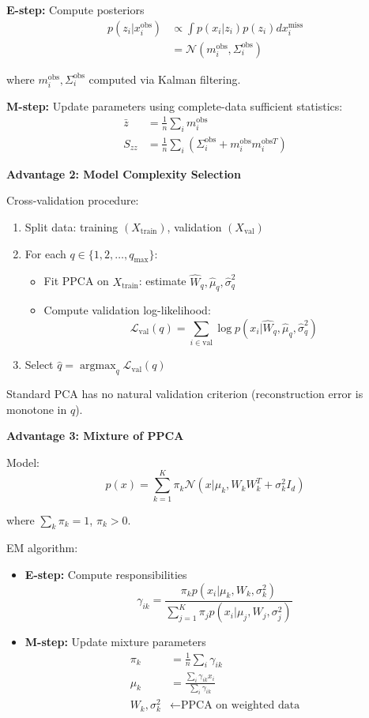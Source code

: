 \documentclass[12pt]{article}
\DeclareMathOperator{\argmax}{argmax}
\begin{document}
\begin{explanation}
\textbf{E-step:} Compute posteriors
\begin{align*}
p(z_i | x_i^{\text{obs}}) &\propto \int p(x_i | z_i)p(z_i) dx_i^{\text{miss}} \\
&= \mathcal{N}(m_i^{\text{obs}}, \Sigma_i^{\text{obs}})
\end{align*}

where $m_i^{\text{obs}}, \Sigma_i^{\text{obs}}$ computed via Kalman filtering.

\textbf{M-step:} Update parameters using complete-data sufficient statistics:
\begin{align*}
\bar{z} &= \frac{1}{n}\sum_i m_i^{\text{obs}} \\
S_{zz} &= \frac{1}{n}\sum_i (\Sigma_i^{\text{obs}} + m_i^{\text{obs}}m_i^{\text{obs}T})
\end{align*}

\textbf{Advantage 2: Model Complexity Selection}

Cross-validation procedure:
\begin{enumerate}
    \item Split data: training $(X_{\text{train}})$, validation $(X_{\text{val}})$
    \item For each $q \in \{1, 2, \ldots, q_{\max}\}$:
    \begin{itemize}
        \item Fit PPCA on $X_{\text{train}}$: estimate $\hat{W}_q, \hat{\mu}_q, \hat{\sigma}_q^2$
        \item Compute validation log-likelihood:
        \[
        \mathcal{L}_{\text{val}}(q) = \sum_{i \in \text{val}} \log p(x_i | \hat{W}_q, \hat{\mu}_q, \hat{\sigma}_q^2)
        \]
    \end{itemize}
    \item Select $\hat{q} = \argmax_q \mathcal{L}_{\text{val}}(q)$
\end{enumerate}

Standard PCA has no natural validation criterion (reconstruction error is monotone in $q$).

\textbf{Advantage 3: Mixture of PPCA}

Model:
\[
p(x) = \sum_{k=1}^K \pi_k \mathcal{N}(x | \mu_k, W_kW_k^T + \sigma_k^2I_d)
\]

where $\sum_k \pi_k = 1$, $\pi_k > 0$.

EM algorithm:
\begin{itemize}
    \item \textbf{E-step:} Compute responsibilities
    \[
    \gamma_{ik} = \frac{\pi_k p(x_i | \mu_k, W_k, \sigma_k^2)}{\sum_{j=1}^K \pi_j p(x_i | \mu_j, W_j, \sigma_j^2)}
    \]
    \item \textbf{M-step:} Update mixture parameters
    \begin{align*}
    \pi_k &= \frac{1}{n}\sum_i \gamma_{ik} \\
    \mu_k &= \frac{\sum_i \gamma_{ik} x_i}{\sum_i \gamma_{ik}} \\
    W_k, \sigma_k^2 &\leftarrow \text{PPCA on weighted data}
    \end{align*}
\end{itemize}


\end{explanation}
\end{document}
